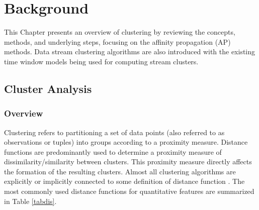 \setlength{\parindent}{2em}
% 
\chapter{Background}


This Chapter presents an overview of clustering by reviewing the concepts, methods, and underlying steps, focusing on the affinity propagation (AP) methods. Data stream clustering algorithms are also introduced with the existing time window models being used for computing stream clusters. 





\section{Cluster Analysis}

\subsection{Overview}
Clustering refers to partitioning a set of data points (also referred to as observations or tuples) into groups according to a proximity measure. Distance functions are predominantly used to determine a proximity measure of dissimilarity/similarity between clusters.  This proximity measure directly affects the formation of the resulting clusters. Almost all clustering algorithms are explicitly or implicitly connected to some definition of distance function \cite{zumel2014practical}. The most commonly used distance functions for quantitative features are summarized in Table \ref{tabdis}. 





